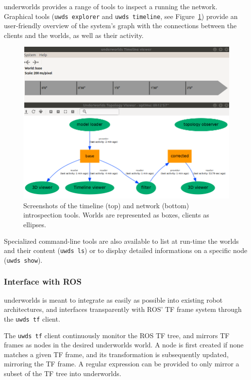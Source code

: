 \documentclass[letterpaper, 10 pt, conference]{ieeeconf}  %
\newcommand{\uwds}{{\sc underworlds}\xspace}
\begin{document}
\uwds provides a range of tools to inspect a running the network. Graphical
tools ({\tt uwds explorer} and {\tt uwds timeline}, see Figure~\ref{fig|explorer})
provide an user-friendly overview of the system's graph with the connections
between the clients and the worlds, as well as their activity.

\begin{figure}
    \centering
    \includegraphics[width=\linewidth]{tools}
    \caption{Screenshots of the timeline (top) and network (bottom)
    introspection tools. Worlds are represented as boxes, clients as ellipses.}
    \label{fig|explorer}
\end{figure}

Specialized command-line tools are also available to list at run-time the worlds
and their content ({\tt uwds ls}) or to display detailed informations on a
specific node ({\tt uwds show}).

\subsubsection{Interface with ROS}

\uwds is meant to integrate as easily as possible into existing robot
architectures, and interfaces transparently with ROS' TF frame system through
the {\tt uwds tf} client.

The {\tt uwds tf} client continuously monitor the ROS TF tree, and mirrors
TF frames as nodes in the desired \uwds world. A node is first created if none
matches a given TF frame, and its transformation is subsequently updated,
mirroring the TF frame. A regular expression can be provided to only mirror a
subset of the TF tree into \uwds.
\end{document}
